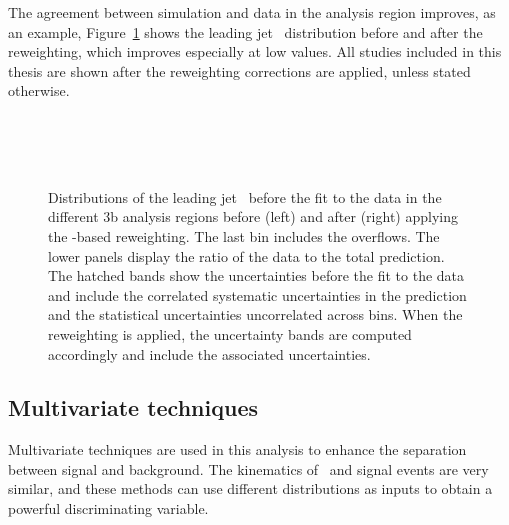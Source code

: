 The agreement between simulation and data in the analysis region improves, as an example, Figure~\ref{tqX:RWeffect} shows the leading jet \pT\ distribution before and after the reweighting, which improves especially at low values. All studies included in this thesis are shown after the reweighting corrections are applied, unless stated otherwise.\\

\begin{figure}[htb]
    \RawFloats
    \begin{center}
     \\
     \\
     \\
    \caption{
    Distributions of the leading jet \pT\ before the fit to the data in the different 3b analysis regions before (left) and after (right) applying the \HTall-based reweighting. The last bin includes the overflows. 
    The lower panels display the ratio of the data to the total prediction.
    The hatched bands show the uncertainties before the fit to the data and include the correlated systematic uncertainties in the prediction and the statistical uncertainties uncorrelated across bins. When the reweighting is applied, the uncertainty bands are computed accordingly and include the associated uncertainties.    
    }
    \label{tqX:RWeffect}
\end{center}
\end{figure}
\clearpage
\subsection{Multivariate techniques}

Multivariate techniques are used in this analysis to enhance the separation between signal and background. The kinematics of \ttb\ and signal events are very similar, and these methods can use different distributions as inputs to obtain a powerful discriminating variable.\\

